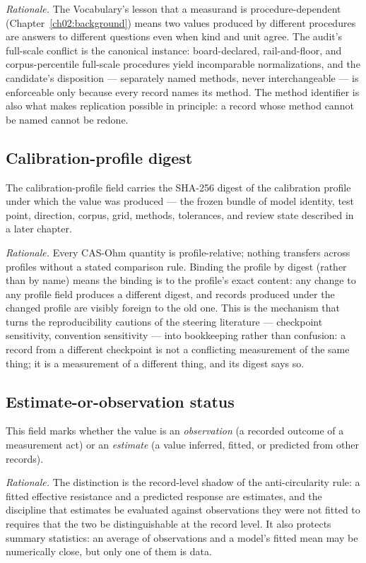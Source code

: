 \emph{Rationale.} The Vocabulary's lesson that a measurand is procedure-dependent (Chapter~\ref{ch02:background}) means two values produced by different procedures are answers to different questions even when kind and unit agree. The audit's full-scale conflict is the canonical instance: board-declared, rail-and-floor, and corpus-percentile full-scale procedures yield incomparable normalizations, and the candidate's disposition --- separately named methods, never interchangeable --- is enforceable only because every record names its method. The method identifier is also what makes replication possible in principle: a record whose method cannot be named cannot be redone.

\subsection{Calibration-profile digest}\label{ch03:field:profile}

The calibration-profile field carries the SHA-256 digest of the calibration profile under which the value was produced --- the frozen bundle of model identity, test point, direction, corpus, grid, methods, tolerances, and review state described in a later chapter.

\emph{Rationale.} Every CAS-Ohm quantity is profile-relative; nothing transfers across profiles without a stated comparison rule. Binding the profile by digest (rather than by name) means the binding is to the profile's exact content: any change to any profile field produces a different digest, and records produced under the changed profile are visibly foreign to the old one. This is the mechanism that turns the reproducibility cautions of the steering literature --- checkpoint sensitivity, convention sensitivity --- into bookkeeping rather than confusion: a record from a different checkpoint is not a conflicting measurement of the same thing; it is a measurement of a different thing, and its digest says so.

\subsection{Estimate-or-observation status}\label{ch03:field:estobs}

This field marks whether the value is an \emph{observation} (a recorded outcome of a measurement act) or an \emph{estimate} (a value inferred, fitted, or predicted from other records).

\emph{Rationale.} The distinction is the record-level shadow of the anti-circularity rule: a fitted effective resistance and a predicted response are estimates, and the discipline that estimates be evaluated against observations they were not fitted to requires that the two be distinguishable at the record level. It also protects summary statistics: an average of observations and a model's fitted mean may be numerically close, but only one of them is data.

